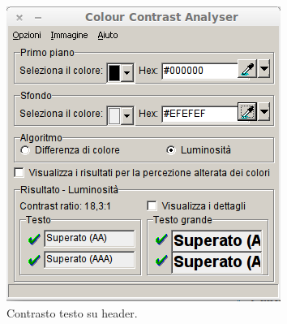 \documentclass[a4paper]{article}
\begin{document}
\begin{figure}[htbp]
\begin{minipage}[b]{0.47\textwidth}
\includegraphics[width=\textwidth]{test/contrasto/Test_Header_Banner.png}
\caption{\label{f_etichetta}Contrasto testo su header.}
\end{minipage}
\end{figure}
\end{document}
